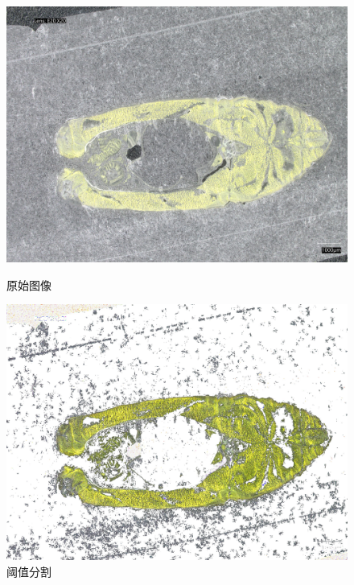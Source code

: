\begin{figure}
    \centering
    \begin{minipage}{0.45\textwidth}
        \centering
        \includegraphics[width=\textwidth]{./fig/model2/origin20240205_161427.jpg}
        \caption{原始图像}
        \label{fig:origin}
    \end{minipage}
    \begin{minipage}{0.45\textwidth}
        \centering
        \includegraphics[width=\textwidth]{./fig/model2/yellow20240205_161427.jpg}
        \caption{阈值分割}
        \label{fig:yellow}
    \end{minipage}
\end{figure}


